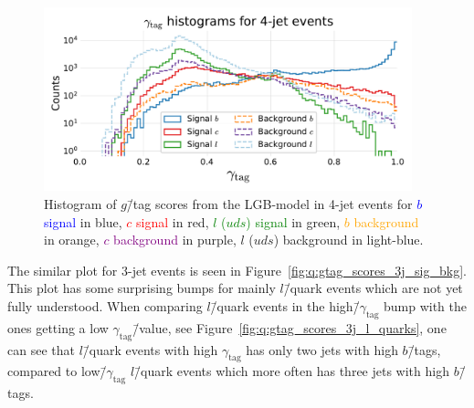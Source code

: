 \begin{figure}[h!]
  \centerfloat
  \includegraphics[width=0.95\textwidth, trim=10 10 10 45, clip]{figures/quarks/gtag-histogram-sigbkg-down_sample=1.00-ML_vars=vertex-selection=b-ejet_min=4-n_iter_RS_lgb=99-n_iter_RS_xgb=9-cdot_cut=0.90-version=19-njet=4.pdf}
  \caption[Distribution of $g$\=/Tag Scores in 4-Jet Events for Signal and Background]
          {Histogram of $g$\=/tag scores from the LGB-model in 4-jet events for \textcolor{blue}{$b$ signal} in blue, \textcolor{red}{$c$ signal} in red, \textcolor{green}{$l$ ($uds$) signal} in green, \textcolor{orange}{$b$ background} in orange, \textcolor{purple}{$c$ background} in purple, \textcolor{light-blue}{$l$ ($uds$) background} in light-blue.
          } 
  \label{fig:q:gtag_scores_4j_sig_bkg}
\end{figure}

The similar plot for 3-jet events is seen in Figure~\ref{fig:q:gtag_scores_3j_sig_bkg}. This plot has some surprising bumps for mainly $l$\=/quark events which are not yet fully understood. When comparing $l$\=/quark events in the high\=/$\gamma_\mathrm{tag}$ bump with the ones getting a low $\gamma_\mathrm{tag}$\=/value, see Figure~\ref{fig:q:gtag_scores_3j_l_quarks}, one can see that $l$\=/quark events with high $\gamma_\mathrm{tag}$ has only two jets with high $b$\=/tags, compared to low\=/$\gamma_\mathrm{tag}$ $l$\=/quark events which more often has three jets with high $b$\=/tags. 

